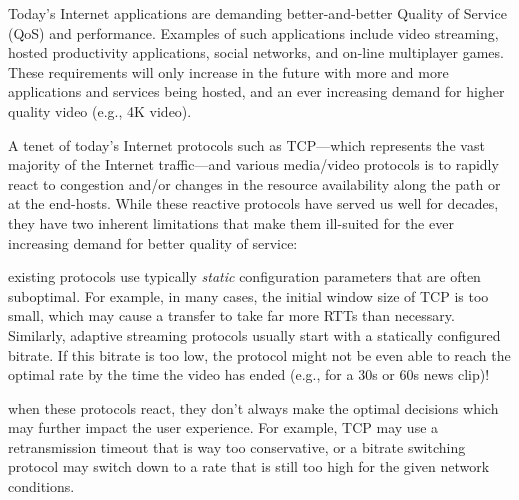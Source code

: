 


Today's Internet applications are demanding better-and-better Quality of Service (QoS) and performance. Examples of such applications include video streaming, hosted productivity applications, social networks, and on-line multiplayer games. These requirements will only increase in the future with more and more applications and services being hosted, and an ever increasing demand for higher quality video (e.g., 4K video).

A tenet of today's Internet protocols such as TCP---which represents the vast majority of the Internet traffic---and various media/video protocols is to rapidly react to congestion and/or changes in the resource availability along the path or at the end-hosts. While these reactive protocols have served us well for decades, they have two inherent limitations that make them ill-suited for the ever increasing demand for better quality of service: 

 existing protocols use typically \emph{static} configuration parameters that are often suboptimal. For example, in many cases, the initial window size of TCP is too small, which may cause a transfer to take far more RTTs than necessary. Similarly, adaptive streaming protocols usually start with a statically configured bitrate. If this bitrate is too low, the protocol might not be even able to reach the optimal rate by the time the video has ended (e.g., for a 30s or 60s news clip)!

 when these protocols react, they don't always make the optimal decisions which may further impact the user experience. For example, TCP may use a retransmission timeout that is way too conservative, or a bitrate switching protocol may switch down to a rate that is still too high for the given network conditions.

